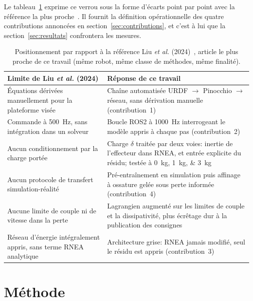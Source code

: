 \documentclass[a4paper, oneside]{article}
\begin{document}
Le tableau~\ref{tab:gaps} exprime ce verrou sous la forme d'écarts point par
point avec la référence la plus proche~\cite{liu2024}. Il fournit la définition
opérationnelle des quatre contributions annoncées en
section~\ref{sec:contributions}, et c'est à lui que la
section~\ref{sec:resultats} confrontera les mesures.

\begin{table}[htbp]
\centering
\caption{Positionnement par rapport à la référence Liu \emph{et al.}
(2024)~\cite{liu2024}, article le plus proche de ce travail (même robot, même
classe de méthodes, même finalité).}
\label{tab:gaps}
\small
\begin{tabular}{@{}p{}p{}@{}}
\toprule
\textbf{Limite de Liu \emph{et al.} (2024)} & \textbf{Réponse de ce travail} \\
\midrule
Équations dérivées manuellement pour la plateforme visée & Chaîne automatisée
URDF $\rightarrow$ Pinocchio $\rightarrow$ réseau, sans dérivation manuelle
(contribution~1) \\
Commande à \SI{500}{Hz}, sans intégration dans un solveur & Boucle ROS2 à \SI{1000}{Hz}
interrogeant le modèle appris à chaque pas (contribution~2) \\
Aucun conditionnement par la charge portée & Charge $\delta$ traitée par deux
voies: inertie de l'effecteur dans RNEA, et entrée explicite du résidu;
testée à \SIlist{0;1;3}{kg} \\
Aucun protocole de transfert simulation-réalité & Pré-entraînement en
simulation puis affinage à ossature gelée sous perte informée
(contribution~4) \\
Aucune limite de couple ni de vitesse dans la perte & Lagrangien augmenté sur
les limites de couple et la dissipativité, plus écrêtage dur à la publication
des consignes \\
Réseau d'énergie intégralement appris, sans terme RNEA analytique &
Architecture grise: RNEA jamais modifié, seul le résidu est appris
(contribution~3) \\
\bottomrule
\end{tabular}
\end{table}

\section{Méthode}
\label{sec:methode}
\end{document}
